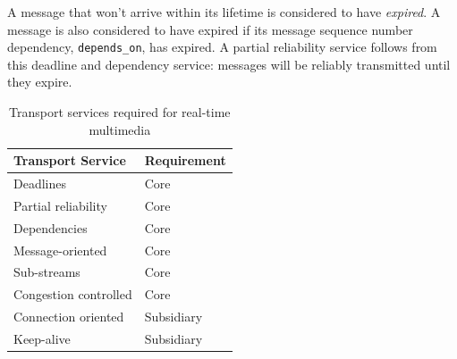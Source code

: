 \documentclass[10pt]{sig-alternate-05-2015}
\begin{document}
A message that won't arrive within its lifetime is considered to have
\emph{expired}. A message is also considered to have expired if its
message sequence number dependency, \texttt{depends\_on},
has expired. A partial reliability service follows
from this deadline and dependency service: messages will be reliably
transmitted until they expire.


\begin{table}
  \centering
  \begin{tabular}{ll}
    \toprule
      Transport Service     & Requirement \\
    \midrule
      Deadlines             & Core        \\
      Partial reliability   & Core        \\
      Dependencies          & Core        \\
      Message-oriented      & Core        \\
      Sub-streams           & Core        \\
      Congestion controlled & Core        \\
      Connection oriented   & Subsidiary  \\
      Keep-alive            & Subsidiary  \\
    \bottomrule
  \end{tabular}
  \caption{Transport services required for real-time multimedia}
  \label{tab:services}
\end{table}
\end{document}

